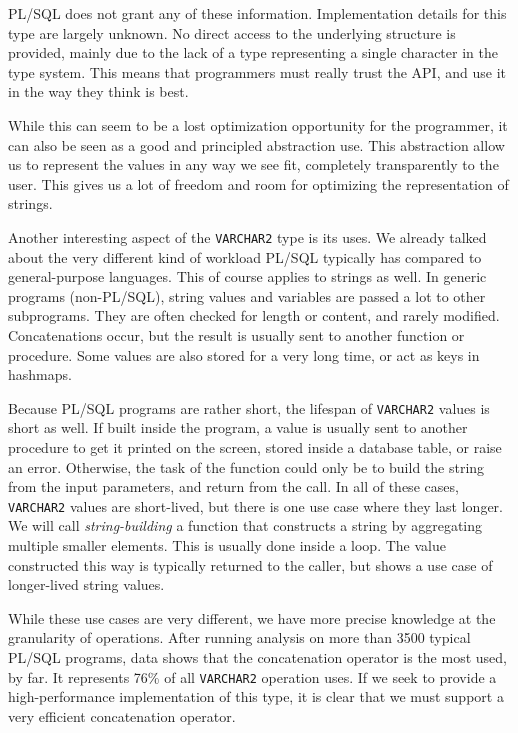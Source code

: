 \documentclass[twoside,11pt,a4paper]{article}
\newcommand{\pls}[1]{\texttt{#1}}
\newcommand{\plstype}[1]{\pls{#1}}
\newcommand{\varchar}{\plstype{VARCHAR2}}
\begin{document}
PL/SQL does not grant any of these information. Implementation details for this type are largely unknown. No direct access to the underlying structure is provided, mainly due to the lack of a type representing a single character in the type system. This means that programmers must really trust the API, and use it in the way they think is best. 

While this can seem to be a lost optimization opportunity for the programmer, it can also be seen as a good and principled abstraction use. This abstraction allow us to represent the values in any way we see fit, completely transparently to the user. This gives us a lot of freedom and room for optimizing the representation of strings.

Another interesting aspect of the \varchar{} type is its uses. We already talked about the very different kind of workload PL/SQL typically has compared to general-purpose languages. This of course applies to strings as well. In generic programs (non-PL/SQL), string values and variables are passed a lot to other subprograms. They are often checked for length or content, and rarely modified. Concatenations occur, but the result is usually sent to another function or procedure. Some values are also stored for a very long time, or act as keys in hashmaps.

Because PL/SQL programs are rather short, the lifespan of \varchar{} values is short as well. If built inside the program, a value is usually sent to another procedure to get it printed on the screen, stored inside a database table, or raise an error. Otherwise, the task of the function could only be to build the string from the input parameters, and return from the call. In all of these cases, \varchar{} values are short-lived, but there is one use case where they last longer. We will call \textit{string-building} a function that constructs a string by aggregating multiple smaller elements. This is usually done inside a loop. The value constructed this way is typically returned to the caller, but shows a use case of longer-lived string values.


While these use cases are very different, we have more precise knowledge at the granularity of operations. After running analysis on more than 3500 typical PL/SQL programs, data shows that the concatenation operator is the most used, by far. It represents 76\% of all \varchar{} operation uses. If we seek to provide a high-performance implementation of this type, it is clear that we must support a very efficient concatenation operator.
\end{document}
